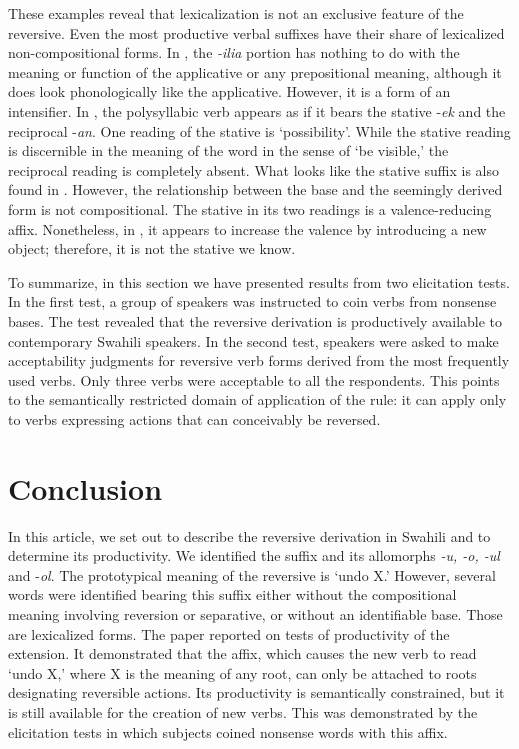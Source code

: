 \documentclass[output=paper]{langsci/langscibook}
\begin{document}
These examples reveal that lexicalization is not an exclusive feature of the reversive. Even the most productive verbal suffixes have their share of lexicalized non-compositional forms. In , the \textit{-ilia} portion has nothing to do with the meaning or function of the applicative or any prepositional meaning, although it does look phonologically like the applicative. However, it is a form of an intensifier. In , the polysyllabic verb appears as if it bears the stative -\textit{ek} and the reciprocal -\textit{an}. One reading of the stative is ‘possibility’. While the stative reading is discernible in the meaning of the word in the sense of ‘be visible,’ the reciprocal reading is completely absent. What looks like the stative suffix is also found in . However, the relationship between the base  and the seemingly derived form  is not compositional. The stative in its two readings is a valence-reducing affix. Nonetheless, in , it appears to increase the valence by introducing a new object; therefore, it is not the stative we know. 

To summarize, in this section we have presented results from two elicitation tests. In the first test, a group of speakers was instructed to coin verbs from nonsense bases. The test revealed that the reversive derivation is productively available to contemporary Swahili speakers. In the second test, speakers were asked to make acceptability judgments for reversive verb forms derived from the most frequently used verbs. Only three verbs were acceptable to all the respondents. This points to the semantically restricted domain of application of the rule: it can apply only to verbs expressing actions that can conceivably be reversed.

\section{Conclusion}\label{sec:ngonyaningowa:6}

In this article, we set out to describe the reversive derivation in Swahili and to determine its productivity. We identified the suffix and its allomorphs \textit{-u, -o, -ul} and  -\textit{ol}. The prototypical meaning of the reversive is ‘undo X.’ However, several words were identified bearing this suffix either without the compositional meaning involving reversion or separative, or without an identifiable base. Those are lexicalized forms. The paper reported on tests of productivity of the extension. It demonstrated that the affix, which causes the new verb to read ‘undo X,’ where X is the meaning of any root, can only be attached to roots designating reversible actions. Its productivity is semantically constrained, but it is still available for the creation of new verbs. This was demonstrated by the elicitation tests in which subjects coined nonsense words with this affix. 
\end{document}
